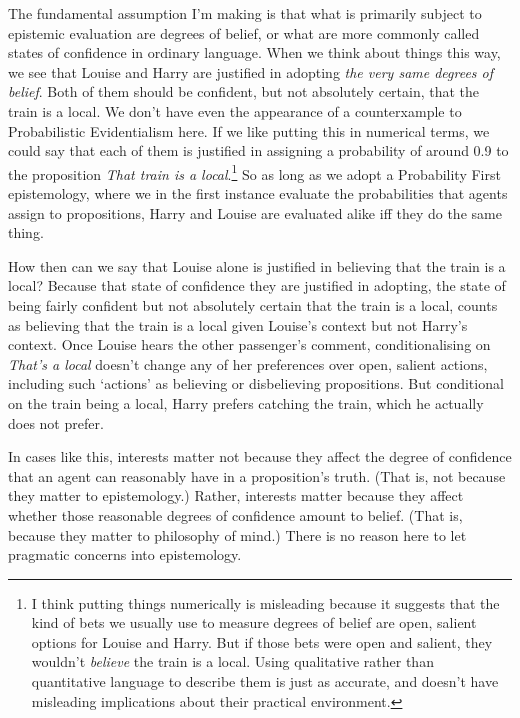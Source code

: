 The fundamental assumption I'm making is that what is primarily subject to epistemic evaluation are degrees of belief, or what are more commonly called states of confidence in ordinary language. When we think about things this way, we see that Louise and Harry are justified in adopting \textit{the very same degrees of belief}. Both of them should be confident, but not absolutely certain, that the train is a local. We don't have even the appearance of a counterxample to Probabilistic Evidentialism here. If we like putting this in numerical terms, we could say that each of them is justified in assigning a probability of around 0.9 to the proposition \textit{That train is a local}.\footnote{I think putting things numerically is misleading because it suggests that the kind of bets we usually use to measure degrees of belief are open, salient options for Louise and Harry. But if those bets were open and salient, they wouldn't \textit{believe} the train is a local. Using qualitative rather than quantitative language to describe them is just as accurate, and doesn't have misleading implications about their practical environment.} So as long as we adopt a Probability First epistemology, where we in the first instance evaluate the probabilities that agents assign to propositions, Harry and Louise are evaluated alike iff they do the same thing.

How then can we say that Louise alone is justified in believing that the train is a local? Because that state of confidence they are justified in adopting, the state of being fairly confident but not absolutely certain that the train is a local, counts as believing that the train is a local given Louise's context but not Harry's context. Once Louise hears the other passenger's comment, conditionalising on \textit{That's a local} doesn't change any of her preferences over open, salient actions, including such `actions' as believing or disbelieving propositions. But conditional on the train being a local, Harry prefers catching the train, which he actually does not prefer.

In cases like this, interests matter not because they affect the degree of confidence that an agent can reasonably have in a proposition's truth. (That is, not because they matter to epistemology.) Rather, interests matter because they affect whether those reasonable degrees of confidence amount to belief. (That is, because they matter to philosophy of mind.) There is no reason here to let pragmatic concerns into epistemology.

